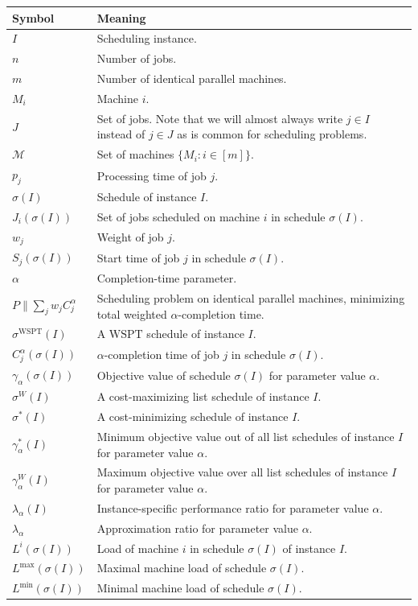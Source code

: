 \documentclass[%
english, titlepage=false %
]{./tum-templates/book/tumbook}
\begin{document}
\begin{tabular}{@{}p{}p{}@{}}
\toprule
Symbol & Meaning \\
\midrule
$I$ & Scheduling instance. \\[2mm]
$n$ & Number of jobs. \\[2mm]
$m$ & Number of identical parallel machines. \\[2mm]
$M_i$ & Machine $i$. \\[2mm]
$J$ & Set of jobs. Note that we will almost always write $j \in I$ instead of $j \in J$ as is common for scheduling problems. \\[2mm]
$\mathcal{M}$ & Set of machines $\{M_i:i\in[m]\}$. \\[2mm]
$p_j$ & Processing time of job $j$. \\[2mm]
$\sigma(I)$ & Schedule of instance $I$. \\[2mm]
$J_i(\sigma(I))$ & Set of jobs scheduled on machine $i$ in schedule $\sigma(I)$.\\[2mm]
$w_j$ & Weight of job $j$. \\[2mm]
$S_j(\sigma(I))$ & Start time of job $j$ in schedule $\sigma(I)$. \\[2mm]
$\alpha$ & Completion-time parameter. \\[2mm]
$P\!\parallel\!\sum_j w_j C^{\alpha}_j$ & Scheduling problem on identical parallel machines, minimizing total weighted $\alpha$-completion time. \\[2mm]
$\sigma^{\mathrm{WSPT}}(I)$ & A $\mathrm{WSPT}$ schedule of instance $I$. \\[2mm]
$C^{\alpha}_{j}(\sigma(I))$ & $\alpha$-completion time of job $j$ in schedule $\sigma(I)$.\\[2mm]
$\gamma_{\alpha}(\sigma(I))$ & Objective value of schedule $\sigma(I)$ for parameter value $\alpha$. \\[2mm]
$\sigma^{W}(I)$ & A cost-maximizing list schedule of instance $I$. \\[2mm]
$\sigma^{*}(I)$ & A cost-minimizing schedule of instance $I$. \\[2mm]
$\gamma^{*}_{\alpha}(I)$ & Minimum objective value out of all list schedules of instance $I$ for parameter value $\alpha$. \\[2mm]
$\gamma^{W}_{\alpha}(I)$ & Maximum objective value over all list schedules of instance $I$ for parameter value $\alpha$. \\[2mm]
$\lambda_{\alpha}(I)$ & Instance-specific performance ratio for parameter value $\alpha$.\\[2mm]
$\lambda_{\alpha}$ & Approximation ratio for parameter value $\alpha$. \\ [2mm]
$L^{i}(\sigma(I))$ & Load of machine $i$ in schedule $\sigma(I)$ of instance $I$. \\[2mm]
$L^{\max}(\sigma(I))$ & Maximal machine load of schedule $\sigma(I)$.\\[2mm]
$L^{\min}(\sigma(I))$ & Minimal machine load of schedule $\sigma(I)$.\\
\bottomrule
\end{tabular}
\end{document}
